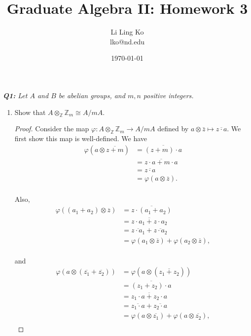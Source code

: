 \documentclass{article}
\begin{document}
\title{Graduate Algebra II: Homework 3}
\author{Li Ling Ko\\ lko@nd.edu}
\date{\today}
\maketitle

\it \textbf{Q1:} Let $A$ and $B$ be abelian groups, and $m,n$ positive
  integers.
  \begin{enumerate}[label={(\alph*)}]
    \item Show that $A\otimes_\mathbb{Z}\mathbb{Z}_m \cong A/mA$.
      \begin{proof}
        Consider the map $\varphi:A\otimes_\mathbb{Z}\mathbb{Z}_m
        \rightarrow A/mA$ defined by
        $a\otimes\bar{z}\mapsto\overline{z\cdot a}$. We first show this map
        is well-defined. We have
        \begin{align*}
          \varphi(a\otimes\overline{z+m}) &=\overline{(z+m)\cdot a}\\
          &=\overline{z\cdot a+m\cdot a}\\
          &=\overline{z\cdot a}\\
          &=\varphi(a\otimes\overline{z}).\\
        \end{align*}

        Also,
        \begin{align*}
          \varphi((a_1+a_2)\otimes\overline{z}) &=\overline{z\cdot
            (a_1+a_2)}\\
          &=\overline{z\cdot a_1 +z\cdot a_2}\\
          &=\overline{z\cdot a_1} +\overline{z\cdot a_2}\\
          &=\varphi(a_1\otimes\overline{z})
            +\varphi(a_2\otimes\overline{z}),\\
        \end{align*}

        and
        \begin{align*}
          \varphi(a\otimes(\overline{z_1}+\overline{z_2}))
            &=\varphi(a\otimes(\overline{z_1+z_2}))\\
          &=\overline{(z_1+z_2)\cdot a}\\
          &=\overline{z_1\cdot a +z_2\cdot a}\\
          &=\overline{z_1\cdot a} +\overline{z_2\cdot a}\\
          &=\varphi(a\otimes\overline{z_1})
            +\varphi(a\otimes\overline{z_2}),\\
        \end{align*}


\end{proof}
\end{enumerate}
\end{document}
